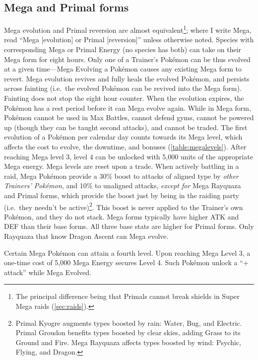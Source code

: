 \subsection{Mega and Primal forms\label{sec:mega}\label{sec:primal}}
Mega evolution and Primal reversion are almost equivalent\footnote{The
 principal difference being that Primals cannot break shields in Super
 Mega raids (\autoref{sec:raids}).}; where I write Mega,
 read ``Mega [evolution] or Primal [reversion]'' unless otherwise noted.
Species with corresponding Mega or Primal Energy (no species has both) can take on their Mega form for eight hours.
Only one of a Trainer's Pokémon can be thus evolved at a given time---Mega
  Evolving a Pokémon causes any existing Mega form to revert.
Mega evolution revives and fully heals the evolved Pokémon, and persists across
  fainting (i.e.\ the evolved Pokémon can be revived into the Mega form).
Fainting does not stop the eight hour counter.
When the evolution expires, the Pokémon has a rest period before it can Mega evolve again.
While in Mega form, Pokémon cannot be used in Max Battles, cannot defend gyms,
 cannot be powered up (though they can be taught second attacks), and cannot be traded.
The first evolution of a Pokémon per calendar day counts towards its Mega level,
  which affects the cost to evolve, the downtime, and bonuses (\autoref{table:megalevels}).
After reaching Mega level 3, level 4 can be unlocked with 5,000 units of the appropriate Mega energy.
Mega levels are reset upon a trade.
When actively battling in a raid, Mega Pokémon provide a 30\% boost to attacks of aligned
  type by \textit{other Trainers' Pokémon}, and 10\% to unaligned attacks,
  \textit{except for} Mega Rayquaza and Primal forms, which provide the boost just
  by being in the raiding party (i.e.\ they needn't be active)\footnote{Primal Kyogre
  augments types boosted by rain: Water, Bug, and Electric.
  Primal Groudon benefits types boosted by clear skies, adding Grass to its Ground and Fire.
  Mega Rayquaza affects types boosted by wind: Psychic, Flying, and Dragon.}.
This boost is never applied to the Trainer's own Pokémon, and they do not stack.
Mega forms typically have higher ATK and DEF than their base forms.
All three base stats are higher for Primal forms.
Only Rayquaza that know Dragon Ascent can Mega evolve.

Certain Mega Pokémon can attain a fourth level.
Upon reaching Mega Level 3, a one-time cost of 5,000 Mega Energy secures Level 4.
Such Pokémon unlock a ``+ attack'' while Mega Evolved.

